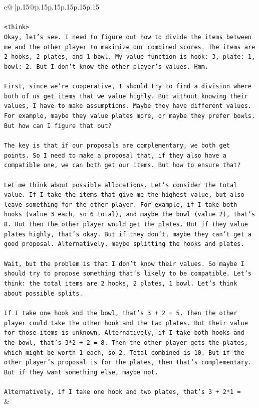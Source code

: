 \documentclass{article}
\begin{document}
{\begin{supertabular}{c@{$\;$}|p{.15\linewidth}@{}p{.15\linewidth}p{.15\linewidth}p{.15\linewidth}p{.15\linewidth}p{.15\linewidth}}
{{{\\ 
\\ 
\texttt{<think>} \\
\texttt{Okay, let's see. I need to figure out how to divide the items between me and the other player to maximize our combined scores. The items are 2 hooks, 2 plates, and 1 bowl. My value function is hook: 3, plate: 1, bowl: 2. But I don't know the other player's values. Hmm.} \\
\\ 
\texttt{First, since we're cooperative, I should try to find a division where both of us get items that we value highly. But without knowing their values, I have to make assumptions. Maybe they have different values. For example, maybe they value plates more, or maybe they prefer bowls. But how can I figure that out?} \\
\\ 
\texttt{The key is that if our proposals are complementary, we both get points. So I need to make a proposal that, if they also have a compatible one, we can both get our items. But how to ensure that?} \\
\\ 
\texttt{Let me think about possible allocations. Let's consider the total value. If I take the items that give me the highest value, but also leave something for the other player. For example, if I take both hooks (value 3 each, so 6 total), and maybe the bowl (value 2), that's 8. But then the other player would get the plates. But if they value plates highly, that's okay. But if they don't, maybe they can't get a good proposal. Alternatively, maybe splitting the hooks and plates.} \\
\\ 
\texttt{Wait, but the problem is that I don't know their values. So maybe I should try to propose something that's likely to be compatible. Let's think: the total items are 2 hooks, 2 plates, 1 bowl. Let's think about possible splits.} \\
\\ 
\texttt{If I take one hook and the bowl, that's 3 + 2 = 5. Then the other player could take the other hook and the two plates. But their value for those items is unknown. Alternatively, if I take both hooks and the bowl, that's 3*2 + 2 = 8. Then the other player gets the plates, which might be worth 1 each, so 2. Total combined is 10. But if the other player's proposal is for the plates, then that's complementary. But if they want something else, maybe not.} \\
\\ 
\texttt{Alternatively, if I take one hook and two plates, that's 3 + 2*1 =} \\
            }
        }
    }
    & \\ \\


\end{supertabular}}
\end{document}

